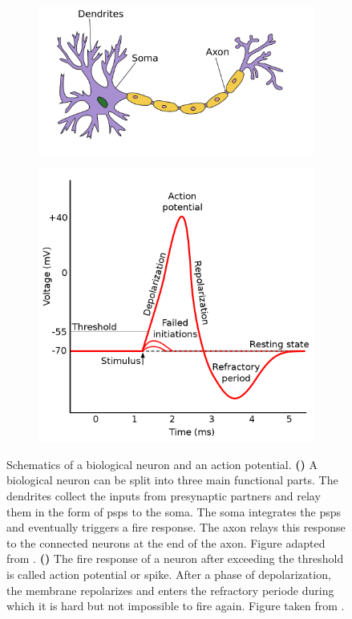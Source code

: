 \begin{figure}
	\begin{subfigure}{0.5\textwidth}
		\centering
		\caption{}
		\vspace{0.75cm}
		\includegraphics[width=\linewidth, valign=t]{figures/Neuron.pdf}
		\vspace{1.25cm}	
		\label{biosynapse}
	\end{subfigure}
	\begin{subfigure}{0.5\textwidth}
		\centering
		\caption{}
		\includegraphics[width=0.8\linewidth, valign=t]{figures/action_potential.png}
		\label{actionpotential}
	\end{subfigure}
	\caption[Schematics of a biological neuron and an action potential]{Schematics of a biological neuron and an action potential. \textbf{()} A biological neuron can be split into three main functional parts. The dendrites collect the inputs from presynaptic partners and relay them in the form of \glspl{psp} to the soma. The soma integrates the \glspl{psp} and eventually triggers a fire response. The axon relays this response to the connected neurons at the end of the axon. Figure adapted from \citealp{picture_neuron}. \textbf{()} The fire response of a neuron after exceeding the threshold is called action potential or spike. After a phase of depolarization, the membrane repolarizes and enters the refractory periode during which it is hard but not impossible to fire again. Figure taken from \citealp{picture_actionpotential}.}
	\label{biologicalneuron}
	
\end{figure}
